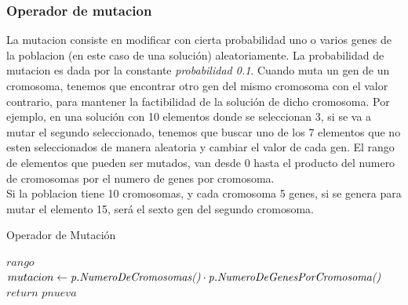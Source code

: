 \documentclass{article}
\begin{document}
\subsubsection{\scriptsize Operador de mutacion}
La mutacion consiste en modificar con cierta probabilidad uno o varios genes de la poblacion (en este caso de una solución)
aleatoriamente. La probabilidad de mutacion es dada por la constante \emph{probabilidad 0.1}.
Cuando muta un gen de un cromosoma, tenemos que encontrar otro gen del mismo cromosoma con el valor contrario,
para mantener la factibilidad de la solución de dicho cromosoma.
Por ejemplo, en una solución con 10 elementos donde se seleccionan 3, si se va a mutar el segundo seleccionado, tenemos que buscar uno de los 7
elementos que no esten seleccionados de manera aleatoria y cambiar el valor de cada gen.
El rango de elementos que pueden ser mutados, van desde 0 hasta el producto del numero de cromosomas por el numero de genes
por cromosoma.\\
Si la poblacion tiene 10 cromosomas, y cada cromosoma 5 genes, si se genera para mutar el elemento 15, será el sexto gen del segundo cromosoma.

\begin{algorithm}[H]
	\scriptsize
	\label{Operador de Mutacion}
	\caption{Operador de Mutación}
	\vspace{3mm}

	$rango$ $mutacion \leftarrow \emph{p.NumeroDeCromosomas()} \cdot \emph{p.NumeroDeGenesPorCromosoma()} $\\

	$return$ $pnueva$\\

\end{algorithm}
\vspace {3mm}
\end{document}
